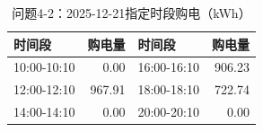 \begin{table}[H]\centering\small\caption{问题4-2：2025-12-21指定时段购电（kWh）}\label{tab:q4_220251221p}
\begin{tabular}{lrlr}\toprule
时间段 & 购电量 & 时间段 & 购电量\\\midrule
10:00-10:10 & 0.00 & 16:00-16:10 & 906.23\\
12:00-12:10 & 967.91 & 18:00-18:10 & 722.74\\
14:00-14:10 & 0.00 & 20:00-20:10 & 0.00\\
\bottomrule\end{tabular}\end{table}
